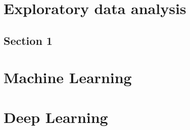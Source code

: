 \documentclass[12pt]{report}
\begin{document}
{
\tableofcontents
}
\pagebreak

\chapter{Exploratory data analysis}
    \section{Section 1}
    
\chapter{Machine Learning}
\chapter{Deep Learning}

    
        
\end{document}
